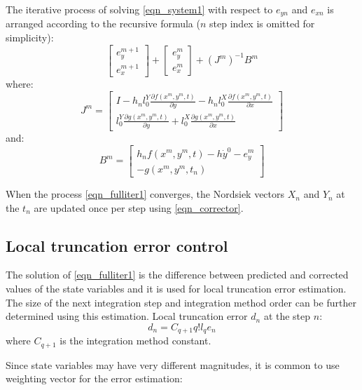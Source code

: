 \documentclass[lettersize,journal]{IEEEtran}
\begin{document}
The iterative process of solving \eqref{eqn_system1} with respect to \(e_{yn}\) and \(e_{xn}\) is arranged according to the recursive formula (\(n\) step index is omitted for simplicity):
\begin{equation}
	\label{eqn_fulliter1}
	\begin{bmatrix}
		e_{y}^{m+1} \\
		e_{x}^{m+1} 
	\end{bmatrix}
	+ 
	\begin{bmatrix}
		e_{y}^m \\
		e_{x}^m 
	\end{bmatrix}
	+ (J^{m})^{-1}B^m
\end{equation}
\noindent where:
\begin{equation}
	J^m = \begin{bmatrix}
		I - h_nl_0^Y\frac{\partial f(x^m, y^m, t)}{\partial y}  -  h_nl_0^X\frac{\partial f(x^m, y^m, t)}{\partial x} \\
		l_0^Y\frac{\partial g(x^m, y^m, t)}{\partial y} +  l_0^X\frac{\partial g(x^m, y^m, t)}{\partial x} 
	\end{bmatrix}
\end{equation}
\noindent and:
\begin{equation}
	B^m = 
	\begin{bmatrix}
		h_nf(x^m, y^m, t) - h \dot{y}^0 - e_y^m \\
		-g(x^m, y^m, t_n) 
	\end{bmatrix}
\end{equation}

When the process \eqref{eqn_fulliter1} converges, the Nordsiek vectors \(X_n\) and \(Y_n\) at the \(t_n\) are updated once per step using \eqref{eqn_corrector}.

\subsection{Local truncation error control}
The solution of \eqref{eqn_fulliter1} is the difference between predicted and corrected values of the state variables and it is used for local truncation error estimation. The size of the next integration step and integration method order can be further determined using this estimation. Local truncation error \(d_n\) at the step \(n\):
\begin{equation}
	d_n=C_{q+1}q!l_qe_n
\end{equation}
\noindent where \(C_{q+1}\) is the integration method constant.

Since state variables may have very different magnitudes, it is common to use weighting vector for the error estimation:
\end{document}
